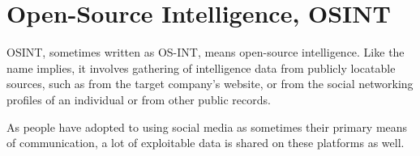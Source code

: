 
\section{Open-Source Intelligence, OSINT}
\begin{comment}

    - OSINT, sometimes written as OS-INT?
    - Data from publicly available resources
        - Company website
        - Social networking sites
        - Sites like archive.org and Google archives
        - Observing people in real life
    - Does not include calling the company and asking for information or any other forms of engagement
    - How modern AI augments OSINT gathering is analyzed in the last chapter
        - Exploration of how AI tools and techniques used for the automation and enhancement of OSINT processes
    - Stress the importance of OSINT within SE
    - Ethical considerations when it comes to OSINT
    - Some case studies highlighting the use of OSINT in real-world social engineering incidents?
    - Countermeasures will also be covered later
        - Strategies for companies to mitigate the risks associated with OSINT-based attacks
        - Integration of AI algorithms for analyzing and extracting valuable insights from OSINT data
        - Impact of AI-powered intelligence gathering of SE attacks
        
\end{comment}

OSINT, sometimes written as OS-INT, means open-source intelligence. Like the name implies, it involves gathering of intelligence data from publicly locatable sources, such as from the target company's website, or from the social networking profiles of an individual or from other public records.

As people have adopted to using social media as sometimes their primary means of communication, a lot of exploitable data is shared on these platforms as well.







